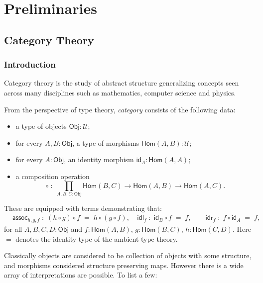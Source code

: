 \chapter{Preliminaries} 
\section{Category Theory}
\subsection{Introduction}
Category theory is the study of abstract structure generalizing
concepts seen across many disciplines such as mathematics, computer
science and physics. \cite{maclane1998-categories-book,awodey2010-category-theory-book} 
\begin{definition}
	From the perspective of type theory, \emph{category} consists
	of the following data:
	\begin{itemize}
		\item a type of objects $\mathsf{Obj} : \mathcal{U}$;
		\item for every $A,B:\mathsf{Obj}$, a type of morphisms
		      $\mathsf{Hom}(A,B) : \mathcal{U}$;
		\item for every $A:\mathsf{Obj}$, an identity morphism
		      $\mathsf{id}_A : \mathsf{Hom}(A,A)$;
		\item a composition operation
		      \[
			      \circ \;:\; \prod_{A,B,C:\mathsf{Obj}}
			      \mathsf{Hom}(B,C) \to \mathsf{Hom}(A,B) \to \mathsf{Hom}(A,C).
		      \]
	\end{itemize}
	These are equipped with terms demonstrating that:
	$$
		\begin{aligned}
			 & \mathsf{assoc}_{h,g,f} \;:\;
			(h \circ g) \circ f \;=\; h \circ (g \circ f),                  \
			 & \mathsf{idl}_{f} \;:\; \mathsf{id}_B \circ f \;=\; f, \qquad
			\mathsf{idr}_{f} \;:\; f \circ \mathsf{id}_A \;=\; f,
		\end{aligned}
	$$
	for all $A,B,C,D:\mathsf{Obj}$ and
	$f:\mathsf{Hom}(A,B)$, $g:\mathsf{Hom}(B,C)$, $h:\mathsf{Hom}(C,D)$.
	Here $=$ denotes the identity type of the ambient type theory.
\end{definition}
Classically objects are considered to be collection of objects with some structure, and morphisms considered structure preserving maps. However there is a wide array of interpretations are possible. To list a few:
